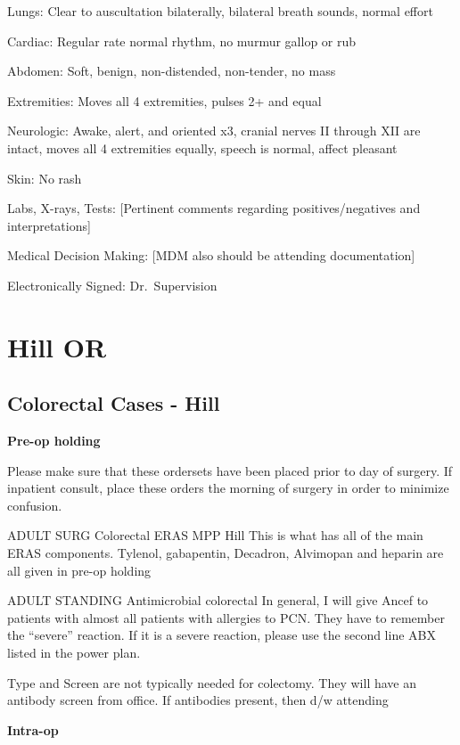 \documentclass[
]{book}
\begin{document}
Lungs: Clear to auscultation bilaterally, bilateral breath sounds, normal effort

Cardiac: Regular rate normal rhythm, no murmur gallop or rub

Abdomen: Soft, benign, non-distended, non-tender, no mass

Extremities: Moves all 4 extremities, pulses 2+ and equal

Neurologic: Awake, alert, and oriented x3, cranial nerves II through XII are intact, moves all 4 extremities equally, speech is normal, affect pleasant

Skin: No rash

Labs, X-rays, Tests: {[}Pertinent comments regarding positives/negatives and interpretations{]}

Medical Decision Making: {[}MDM also should be attending documentation{]}

Electronically Signed: Dr.~Supervision

\hypertarget{part-hill-or}{%
\part*{Hill OR}\label{part-hill-or}}

\hypertarget{colorectal-cases---hill}{%
\chapter{Colorectal Cases - Hill}\label{colorectal-cases---hill}}

\textbf{Pre-op holding}

Please make sure that these ordersets have been placed prior to day of surgery. If inpatient consult, place these orders the morning of surgery in order to minimize confusion.

ADULT SURG Colorectal ERAS MPP Hill This is what has all of the main ERAS components. Tylenol, gabapentin, Decadron, Alvimopan and heparin are all given in pre-op holding

ADULT STANDING Antimicrobial colorectal In general, I will give Ancef to patients with almost all patients with allergies to PCN. They have to remember the ``severe'' reaction. If it is a severe reaction, please use the second line ABX listed in the power plan.

Type and Screen are not typically needed for colectomy. They will have an antibody screen from office. If antibodies present, then d/w attending

\textbf{Intra-op}
\end{document}
